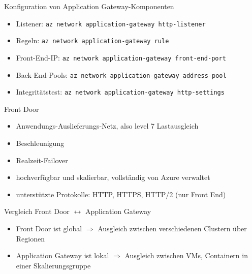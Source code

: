 \begin{flashcard}[Definition]{Konfiguration von Application Gateway-Komponenten}
    \begin{itemize}
        \item Listener: \texttt{az network application-gateway http-listener}
        \item Regeln: \texttt{az network application-gateway rule}
        \item Front-End-IP: \texttt{az network application-gateway front-end-port}
        \item Back-End-Pools: \texttt{az network application-gateway address-pool}
        \item Integritätstest: \texttt{az network application-gateway http-settings}
    \end{itemize}
\end{flashcard}


\begin{flashcard}[Definition]{Front Door}
    \begin{itemize}
        \item Anwendungs-Auslieferungs-Netz, also level 7 Lastausgleich
        \item Beschleunigung
        \item Realzeit-Failover
        \item hochverfügbar und skalierbar, vollständig von Azure verwaltet
        \item unterstützte Protokolle: HTTP, HTTPS, HTTP/2 (nur Front End)
    \end{itemize}
\end{flashcard}

\begin{flashcard}[Definition]{Vergleich Front Door $\leftrightarrow$ Application Gateway}
    \begin{itemize}
        \item Front Door ist global\newline
            $\Rightarrow$ Ausgleich zwischen verschiedenen Clustern über Regionen
        \item Application Gateway ist lokal\newline
            $\Rightarrow$ Ausgleich zwischen VMs, Containern in einer Skalierungsgruppe
    \end{itemize}
\end{flashcard}


